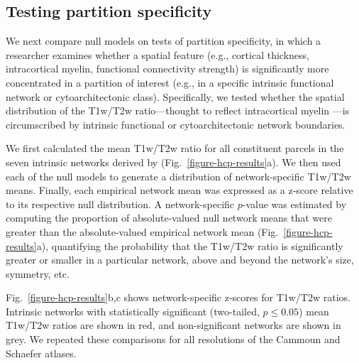 \documentclass[12pt,aps,pra,reprint,showkeys]{revtex4-1}
\begin{document}
\subsection*{Testing partition specificity}

We next compare null models on tests of partition specificity, in which a researcher examines whether a spatial feature (e.g., cortical thickness, intracortical myelin, functional connectivity strength) is significantly more concentrated in a partition of interest (e.g., in a specific intrinsic functional network or cytoarchitectonic class).
Specifically, we tested whether the spatial distribution of the T1w/T2w ratio---thought to reflect intracortical myelin \citep{glasser2011jneuro}---is circumscribed by intrinsic functional \citep{yeo2011organization} or cytoarchitectonic \citep{voneconomo1925cytoarchitecture, scholtens2018neuroimage} network boundaries.

We first calculated the mean T1w/T2w ratio for all constituent parcels in the seven intrinsic networks derived by \citet{yeo2011organization} (Fig.~\ref{figure-hcp-results}a).
We then used each of the null models to generate a distribution of network-specific T1w/T2w means.
Finally, each empirical network mean was expressed as a z-score relative to its respective null distribution.
A network-specific $p$-value was estimated by computing the proportion of absolute-valued null network means that were greater than the absolute-valued empirical network mean (Fig.~\ref{figure-hcp-results}a), quantifying the probability that the T1w/T2w ratio is significantly greater or smaller in a particular network, above and beyond the network's size, symmetry, etc.

Fig.~\ref{figure-hcp-results}b,c shows network-specific z-scores for T1w/T2w ratios.
Intrinsic networks with statistically significant (two-tailed, $p \leq 0.05$) mean T1w/T2w ratios are shown in red, and non-significant networks are shown in grey.
We repeated these comparisons for all resolutions of the Cammoun and Schaefer atlases.
\end{document}
